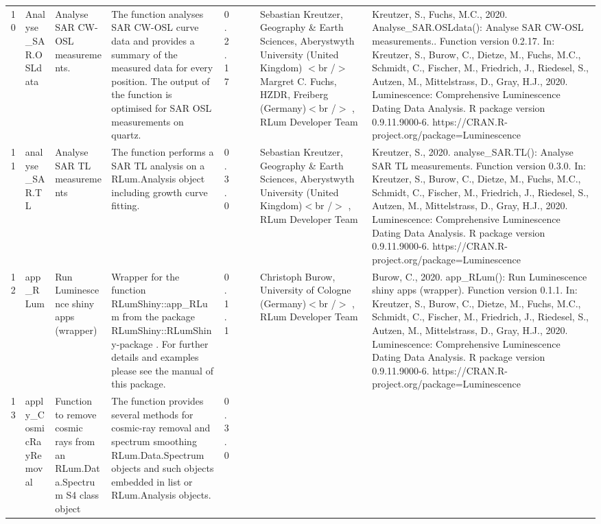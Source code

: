 \begin{table}[ht]
\begin{tabular}{rllllllll}
 \\ 
  10 & Analyse\_SAR.OSLdata & Analyse SAR CW-OSL measurements. & The function analyses SAR CW-OSL curve data and provides a summary of the measured data for every position. The output of the function is optimised for SAR OSL measurements on quartz. & 0.2.17
 &  &  & Sebastian Kreutzer, Geography \& Earth Sciences, Aberystwyth University (United Kingdom) $<$br /$>$ Margret C. Fuchs, HZDR, Freiberg (Germany)$<$br /$>$ , RLum Developer Team & Kreutzer, S., Fuchs, M.C., 2020. Analyse\_SAR.OSLdata(): Analyse SAR CW-OSL measurements.. Function version 0.2.17. In: Kreutzer, S., Burow, C., Dietze, M., Fuchs, M.C., Schmidt, C., Fischer, M., Friedrich, J., Riedesel, S., Autzen, M., Mittelstrass, D., Gray, H.J., 2020. Luminescence: Comprehensive Luminescence Dating Data Analysis. R package version 0.9.11.9000-6. https://CRAN.R-project.org/package=Luminescence
 \\ 
  11 & analyse\_SAR.TL & Analyse SAR TL measurements & The function performs a SAR TL analysis on a RLum.Analysis  object including growth curve fitting. & 0.3.0
 &  &  & Sebastian Kreutzer, Geography \& Earth Sciences, Aberystwyth University (United Kingdom)$<$br /$>$ , RLum Developer Team & Kreutzer, S., 2020. analyse\_SAR.TL(): Analyse SAR TL measurements. Function version 0.3.0. In: Kreutzer, S., Burow, C., Dietze, M., Fuchs, M.C., Schmidt, C., Fischer, M., Friedrich, J., Riedesel, S., Autzen, M., Mittelstrass, D., Gray, H.J., 2020. Luminescence: Comprehensive Luminescence Dating Data Analysis. R package version 0.9.11.9000-6. https://CRAN.R-project.org/package=Luminescence
 \\ 
  12 & app\_RLum & Run Luminescence shiny apps (wrapper) & Wrapper for the function  RLumShiny::app\_RLum  from the package RLumShiny::RLumShiny-package . For further details and examples please see the manual of this package. & 0.1.1
 &  &  & Christoph Burow, University of Cologne (Germany)$<$br /$>$ , RLum Developer Team & Burow, C., 2020. app\_RLum(): Run Luminescence shiny apps (wrapper). Function version 0.1.1. In: Kreutzer, S., Burow, C., Dietze, M., Fuchs, M.C., Schmidt, C., Fischer, M., Friedrich, J., Riedesel, S., Autzen, M., Mittelstrass, D., Gray, H.J., 2020. Luminescence: Comprehensive Luminescence Dating Data Analysis. R package version 0.9.11.9000-6. https://CRAN.R-project.org/package=Luminescence
 \\ 
  13 & apply\_CosmicRayRemoval & Function to remove cosmic rays from an RLum.Data.Spectrum S4 class object & The function provides several methods for cosmic-ray removal and spectrum smoothing  RLum.Data.Spectrum  objects and such objects embedded in  list  or RLum.Analysis  objects. & 0.3.0

\end{tabular}
\end{table}
